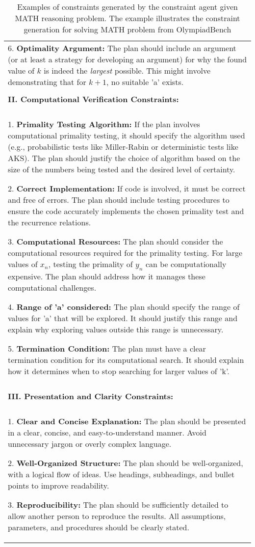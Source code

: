 \begin{table*}
\begin{tabular}{p{\linewidth}}
6. \textbf{Optimality Argument:} The plan should include an argument (or at least a strategy for developing an argument) for why the found value of $k$ is indeed the \textit{largest} possible. This might involve demonstrating that for $k+1$, no suitable 'a' exists.
\\\\
\textbf{II. Computational Verification Constraints:}
\\\\
1. \textbf{Primality Testing Algorithm:} If the plan involves computational primality testing, it should specify the algorithm used (e.g., probabilistic tests like Miller-Rabin or deterministic tests like AKS). The plan should justify the choice of algorithm based on the size of the numbers being tested and the desired level of certainty.

2. \textbf{Correct Implementation:} If code is involved, it must be correct and free of errors. The plan should include testing procedures to ensure the code accurately implements the chosen primality test and the recurrence relations.

3. \textbf{Computational Resources:} The plan should consider the computational resources required for the primality testing. For large values of $x_n$, testing the primality of $y_n$ can be computationally expensive. The plan should address how it manages these computational challenges.

4. \textbf{Range of 'a' considered:} The plan should specify the range of values for 'a' that will be explored. It should justify this range and explain why exploring values outside this range is unnecessary.

5. \textbf{Termination Condition:} The plan must have a clear termination condition for its computational search. It should explain how it determines when to stop searching for larger values of 'k'.
\\\\
\textbf{III. Presentation and Clarity Constraints:}
\\\\
1. \textbf{Clear and Concise Explanation:} The plan should be presented in a clear, concise, and easy-to-understand manner. Avoid unnecessary jargon or overly complex language.

2. \textbf{Well-Organized Structure:} The plan should be well-organized, with a logical flow of ideas. Use headings, subheadings, and bullet points to improve readability.

3. \textbf{Reproducibility:} The plan should be sufficiently detailed to allow another person to reproduce the results. All assumptions, parameters, and procedures should be clearly stated.

 \\ \bottomrule
\end{tabular}
\caption{Examples of constraints generated by the constraint agent given MATH reasoning problem. The example illustrates the constraint generation for solving MATH problem from OlympiadBench}
\label{tab:olympiad_math_constraints}
\end{table*}
